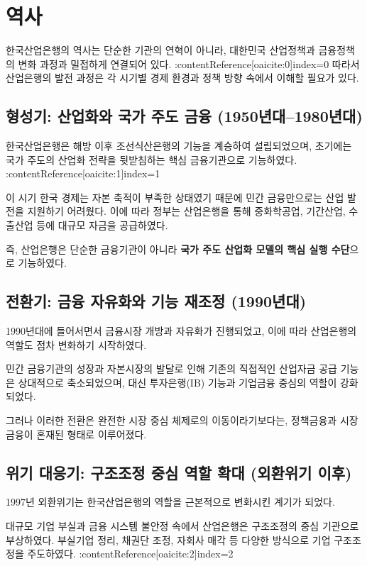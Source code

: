 \section{역사}

한국산업은행의 역사는 단순한 기관의 연혁이 아니라, 대한민국 산업정책과 금융정책의 변화 과정과 밀접하게 연결되어 있다. :contentReference[oaicite:0]{index=0}  
따라서 산업은행의 발전 과정은 각 시기별 경제 환경과 정책 방향 속에서 이해할 필요가 있다.

\subsection{형성기: 산업화와 국가 주도 금융 (1950년대--1980년대)}

한국산업은행은 해방 이후 조선식산은행의 기능을 계승하여 설립되었으며, 초기에는 국가 주도의 산업화 전략을 뒷받침하는 핵심 금융기관으로 기능하였다. :contentReference[oaicite:1]{index=1}  

이 시기 한국 경제는 자본 축적이 부족한 상태였기 때문에 민간 금융만으로는 산업 발전을 지원하기 어려웠다. 이에 따라 정부는 산업은행을 통해 중화학공업, 기간산업, 수출산업 등에 대규모 자금을 공급하였다.

즉, 산업은행은 단순한 금융기관이 아니라 \textbf{국가 주도 산업화 모델의 핵심 실행 수단}으로 기능하였다.

\subsection{전환기: 금융 자유화와 기능 재조정 (1990년대)}

1990년대에 들어서면서 금융시장 개방과 자유화가 진행되었고, 이에 따라 산업은행의 역할도 점차 변화하기 시작하였다.

민간 금융기관의 성장과 자본시장의 발달로 인해 기존의 직접적인 산업자금 공급 기능은 상대적으로 축소되었으며, 대신 투자은행(IB) 기능과 기업금융 중심의 역할이 강화되었다.

그러나 이러한 전환은 완전한 시장 중심 체제로의 이동이라기보다는, 정책금융과 시장금융이 혼재된 형태로 이루어졌다.

\subsection{위기 대응기: 구조조정 중심 역할 확대 (외환위기 이후)}

1997년 외환위기는 한국산업은행의 역할을 근본적으로 변화시킨 계기가 되었다.

대규모 기업 부실과 금융 시스템 불안정 속에서 산업은행은 구조조정의 중심 기관으로 부상하였다. 부실기업 정리, 채권단 조정, 자회사 매각 등 다양한 방식으로 기업 구조조정을 주도하였다. :contentReference[oaicite:2]{index=2}  

